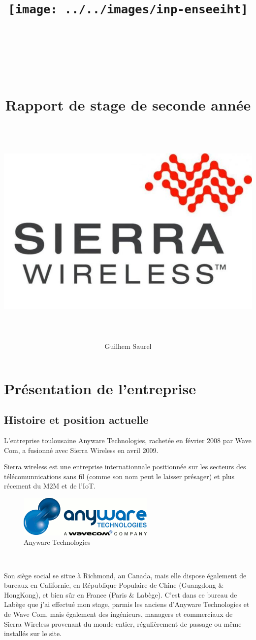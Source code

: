 \documentclass{article}
\title{\texttt{[image: ../../images/inp-enseeiht]} \\ ~ \\ ~ \\ ~ \\ ~ \\ Rapport de stage de seconde année \\ ~ \\ ~ \\ \includegraphics[width=\linewidth]{img/swir.jpg} \\ ~ \\}
\author{Guilhem Saurel}
\date{\oldstylenums{\today}}
\begin{document}
\begin{titlepage}
    \setcounter{page}{0}
    \maketitle
    \thispagestyle{empty}
\end{titlepage}

\tableofcontents
\setcounter{page}{0}
\thispagestyle{empty}

\clearpage

\section{Présentation de l’entreprise}
\subsection{Histoire et position actuelle}

L’entreprise toulousaine Anyware Technologies, rachetée en février 2008 par Wave Com, a fusionné avec Sierra Wireless en avril 2009.

Sierra wireless est une entreprise internationnale positionnée sur les secteurs des télécomunnications sans fil (comme son nom peut le laisser présager) et plus récement du M2M et de l’IoT.

\begin{figure}[h!]
    \centering\includegraphics[width=\linewidth/2]{img/anyware-tech.png}
    \caption{Anyware Technologies}
\end{figure}

~

Son siège social se situe à Richmond, au Canada, mais elle dispose également de bureaux en Californie, en République Populaire de Chine (Guangdong \& HongKong), et bien sûr en France (Paris \& Labège). C’est dans ce bureau de Labège que j’ai effectué mon stage, parmis les anciens d’Anyware Technologies et de Wave Com, mais également des ingénieurs, managers et commerciaux de Sierra Wireless provenant du monde entier, régulièrement de passage ou même installés sur le site.
\end{document}
